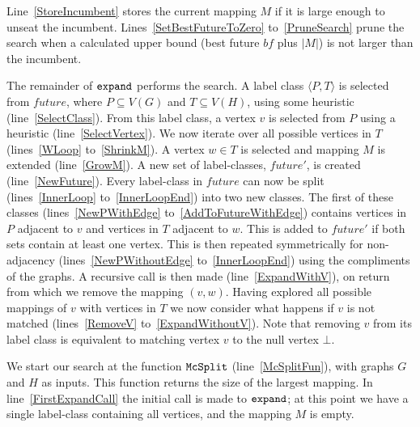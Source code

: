 \documentclass[letterpaper]{article}
\newcommand{\AlgVar}[1]{\mathit{#1}}
\newcommand{\lineref}[1]{line~\ref{#1}}
\newcommand{\linerangeref}[2]{lines~\ref{#1} to~\ref{#2}}
\newcommand{\Lineref}[1]{Line~\ref{#1}}
\newcommand{\Linerangeref}[2]{Lines~\ref{#1} to~\ref{#2}}
\begin{document}
\Lineref{StoreIncumbent} stores the current mapping $M$ if it is large enough
to unseat the incumbent.  \Linerangeref{SetBestFutureToZero}{PruneSearch} prune
the search when a calculated upper bound (best future $\AlgVar{bf}$ plus $|M|$) is not larger
than the incumbent.

The remainder of $\FuncSty{expand}$ performs the search.  A label class
$\langle P, T \rangle$ is selected from $\AlgVar{future}$, where $P \subseteq V(G)$ and $T \subseteq V(H)$,
using some heuristic (\lineref{SelectClass}).  From this label class, a
vertex $v$ is selected from $P$ using a heuristic (\lineref{SelectVertex}). We now
iterate over all possible vertices in $T$ (\linerangeref{WLoop}{ShrinkM}). A
vertex $w \in T$ is selected and mapping $M$ is extended (\lineref{GrowM}). A
new set of label-classes, $\AlgVar{future'}$, is created (\lineref{NewFuture}).
Every label-class in $\AlgVar{future}$ can now be split
(\linerangeref{InnerLoop}{InnerLoopEnd}) into two new classes. The first of
these classes (\linerangeref{NewPWithEdge}{AddToFutureWithEdge}) contains
vertices in $P$ adjacent to $v$ and vertices in $T$ adjacent to $w$.  This is
added to $\AlgVar{future'}$ if both sets contain at least one vertex.  This is
then repeated symmetrically for non-adjacency
(\linerangeref{NewPWithoutEdge}{InnerLoopEnd}) using the compliments of the
graphs.  A recursive call is then made (\lineref{ExpandWithV}), on return from
which we remove the mapping $(v,w)$.  Having explored all possible mappings of
$v$ with vertices in $T$ we now consider what happens if $v$ is not matched
(\linerangeref{RemoveV}{ExpandWithoutV}). Note that removing $v$ from its label
class is equivalent to matching vertex $v$ to the null vertex $\bot$.

We start our search at the function $\FuncSty{McSplit}$ (\lineref{McSplitFun}),
with graphs $G$ and $H$ as inputs.  This function returns the size of the
largest mapping.  In \lineref{FirstExpandCall} the initial call is made to
$\FuncSty{expand}$; at this point we have a single label-class containing all
vertices, and the mapping $M$ is empty.

\end{document}
